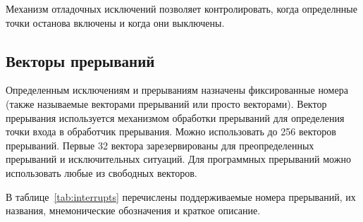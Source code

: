 Механизм отладочных исключений позволяет контролировать, когда определнные
точки останова включены и когда они выключены.

\subsection{Векторы прерываний}
Определенным исключениям и прерываниям назначены фиксированные номера (также
называемые векторами прерываний или просто векторами). Вектор прерывания
используется механизмом обработки прерываний для определения точки входа в
обработчик прерывания. Можно использовать до 256 векторов прерываний. Первые 32 вектора
зарезервированы для преопределенных прерываний и исключительных ситуаций.
Для программных прерываний можно использовать любые из свободных векторов.

В таблице~\ref{tab:interrupts} перечислены поддерживаемые номера прерываний, их названия,
мнемонические обозначения и краткое описание.


